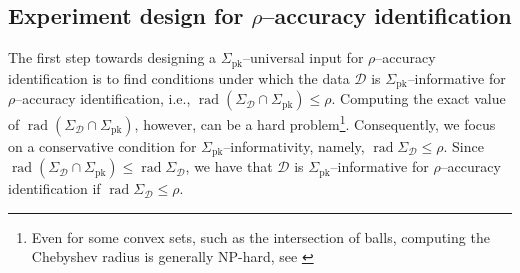 \documentclass[journal,twoside,web]{ieeecolor}
\DeclareMathOperator{\rad}{rad}
\newtheorem{proposition}[theorem]{Proposition}
\begin{document}

\subsection{Experiment design for $\rho$--accuracy identification}
\label{sub:UED_noisy_rho>0}

The first step towards designing a $\Sigma_\text{pk}$--universal input for $\rho$--accuracy identification is to find conditions under which the data $\mathcal{D}$ is $\Sigma_\text{pk}$--informative for $\rho$--accuracy identification, i.e., $\rad(\Sigma_\mathcal{D}\cap\Sigma_\text{pk})\leq \rho$. Computing the exact value of \mbox{$\rad(\Sigma_\mathcal{D}\cap\Sigma_\text{pk})$}, however, can be a hard problem\footnote{Even for some convex sets, such as the intersection of balls, computing the Chebyshev radius is generally NP-hard, see \cite[Thm. 2]{xia2021chebyshev}}. Consequently, we focus on a conservative condition for \mbox{$\Sigma_\text{pk}$--informativity}, namely, $\rad\Sigma_\mathcal{D}\leq \rho$. Since \mbox{$\rad(\Sigma_\mathcal{D}\cap\Sigma_\text{pk})\leq\rad\Sigma_\mathcal{D}$}, we have that $\mathcal{D}$ is \mbox{$\Sigma_\text{pk}$--informative} for \mbox{$\rho$--accuracy} identification if $\rad\Sigma_\mathcal{D}\leq \rho$. 
\end{document}
